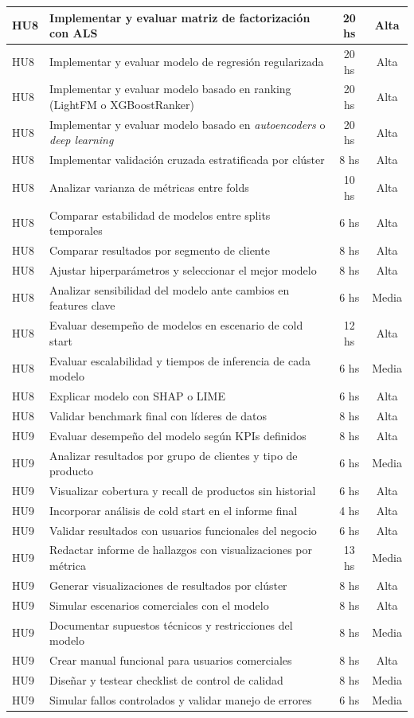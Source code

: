 \documentclass[
11pt, %
]{charter}
\begin{document}
\begin{longtable}{|p{2cm}|p{9cm}|c|c|}
HU8 & Implementar y evaluar matriz de factorización con ALS & 20 hs & Alta \\ \hline
HU8 & Implementar y evaluar modelo de regresión regularizada & 20 hs & Alta \\ \hline
HU8 & Implementar y evaluar modelo basado en ranking (LightFM o XGBoostRanker) & 20 hs & Alta \\ \hline
HU8 & Implementar y evaluar modelo basado en \textit{autoencoders} o \textit{deep learning} & 20 hs & Alta \\ \hline
HU8 & Implementar validación cruzada estratificada por clúster & 8 hs & Alta \\ \hline
HU8 & Analizar varianza de métricas entre folds & 10 hs & Alta \\ \hline
HU8 & Comparar estabilidad de modelos entre splits temporales & 6 hs & Alta \\ \hline
HU8 & Comparar resultados por segmento de cliente & 8 hs & Alta \\ \hline
HU8 & Ajustar hiperparámetros y seleccionar el mejor modelo & 8 hs & Alta \\ \hline
HU8 & Analizar sensibilidad del modelo ante cambios en features clave & 6 hs & Media \\ \hline
HU8 & Evaluar desempeño de modelos en escenario de cold start & 12 hs & Alta \\ \hline
HU8 & Evaluar escalabilidad y tiempos de inferencia de cada modelo & 6 hs & Media \\ \hline
HU8 & Explicar modelo con SHAP o LIME & 6 hs & Alta \\ \hline
HU8 & Validar benchmark final con líderes de datos & 8 hs & Alta \\ \hline

HU9 & Evaluar desempeño del modelo según KPIs definidos & 8 hs & Alta \\ \hline
HU9 & Analizar resultados por grupo de clientes y tipo de producto & 6 hs & Media \\ \hline
HU9 & Visualizar cobertura y recall de productos sin historial & 6 hs & Alta \\ \hline
HU9 & Incorporar análisis de cold start en el informe final & 4 hs & Alta \\ \hline
HU9 & Validar resultados con usuarios funcionales del negocio & 6 hs & Alta \\ \hline
HU9 & Redactar informe de hallazgos con visualizaciones por métrica & 13 hs & Media \\ \hline
HU9 & Generar visualizaciones de resultados por clúster & 8 hs & Alta \\ \hline
HU9 & Simular escenarios comerciales con el modelo & 8 hs & Alta \\ \hline
HU9 & Documentar supuestos técnicos y restricciones del modelo & 8 hs & Media \\ \hline
HU9 & Crear manual funcional para usuarios comerciales & 8 hs & Alta \\ \hline
HU9 & Diseñar y testear checklist de control de calidad & 8 hs & Media \\ \hline
HU9 & Simular fallos controlados y validar manejo de errores & 6 hs & Media \\ \hline


\end{longtable}
\end{document}
